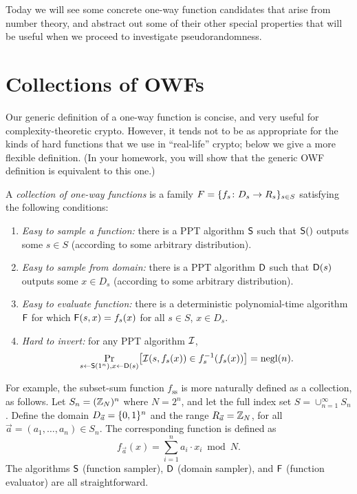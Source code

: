 \documentclass[11pt]{article}
\begin{document}
\thispagestyle{fancy}           %


Today we will see some concrete one-way function candidates that arise
from number theory, and abstract out some of their other special
properties that will be useful when we proceed to investigate
pseudorandomness.

\section{Collections of OWFs}
\label{sec:coll-owfs-vari}

Our generic definition of a one-way function is concise, and very
useful for complexity-theoretic crypto.  However, it tends not to be
as appropriate for the kinds of hard functions that we use in
``real-life'' crypto; below we give a more flexible definition.  (In
your homework, you will show that the generic OWF definition is
equivalent to this one.)

\begin{definition}
  \label{def:collection-owfs}
  A \emph{collection of one-way functions} is a family $F = \{
    f_{s} \colon D_{s} \to R_{s} \}_{s \in S}$ satisfying the following
  conditions:
  \begin{enumerate}
  \item \emph{Easy to sample a function:} there is a PPT algorithm
    $\mathsf{S}$ such that $\mathsf{S}()$ outputs some $s \in S$
    (according to some arbitrary distribution).
  \item \emph{Easy to sample from domain:} there is a PPT algorithm
    $\mathsf{D}$ such that $\mathsf{D}(s)$ outputs some $x \in D_{s}$
    (according to some arbitrary distribution).
  \item \emph{Easy to evaluate function:} there is a deterministic
    polynomial-time algorithm $\mathsf{F}$ for which
    $\mathsf{F}(s,x)=f_{s}(x)$ for all $s \in S$, $x \in D_{s}$.
  \item \emph{Hard to invert:} for any PPT algorithm
    $\mathcal{I}$, \[ \Pr_{s \gets \algo{S}(1^n), x \gets \algo{D}(s)}
    \bracks*{\Inv(s,f_{s}(x)) \in f_{s}^{-1}(f_{s}(x))} = \negl(n). \]
  \end{enumerate}
\end{definition}

For example, the subset-sum function $f_{\text{ss}}$ is more naturally
defined as a collection, as follows.  Let $S_{n} = (\mathbb{Z}_{N})^{n}$ where
$N=2^{n}$, and let the full index set $S = \cup_{n=1}^{\infty} S_{n}$.
Define the domain $D_{\vec{a}} = \{0,1\}^{n}$ and the range $R_{\vec{a}}
= \mathbb{Z}_{N}$, for all $\vec{a} = (a_{1}, \ldots, a_{n}) \in S_{n}$. The
corresponding function is defined as \[ f_{\vec{a}}(x) =
\sum_{i=1}^{n} a_{i} \cdot x_{i} \bmod N. \] The algorithms $\mathsf{S}$
(function sampler), $\mathsf{D}$ (domain sampler), and $\mathsf{F}$
(function evaluator) are all straightforward.
\end{document}
